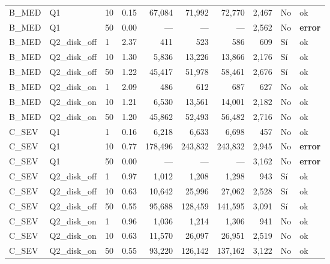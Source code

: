 \documentclass[12pt,a4paper]{article}
\begin{document}
\begin{longtable}{lllrrrrrll}
\rowcolor{warnbg}
B\_MED  & Q1            & 10 & 0.15 & 67{,}084   & 71{,}992  & 72{,}770  & 2{,}467 & No  & \textcolor{green!60!black}{ok} \\
\rowcolor{errbg}
B\_MED  & Q1            & 50 & 0.00 & ---        & ---       & ---       & 2{,}562 & No  & \textcolor{alertred}{\textbf{error}} \\
\rowcolor{warnbg}
B\_MED  & Q2\_disk\_off & 1  & 2.37 & 411        & 523       & 586       & 609     & \textcolor{alertred}{Sí} & \textcolor{green!60!black}{ok} \\
\rowcolor{warnbg}
B\_MED  & Q2\_disk\_off & 10 & 1.30 & 5{,}836    & 13{,}226  & 13{,}866  & 2{,}176 & \textcolor{alertred}{Sí} & \textcolor{green!60!black}{ok} \\
\rowcolor{warnbg}
B\_MED  & Q2\_disk\_off & 50 & 1.22 & 45{,}417   & 51{,}978  & 58{,}461  & 2{,}676 & \textcolor{alertred}{Sí} & \textcolor{green!60!black}{ok} \\
\rowcolor{warnbg}
B\_MED  & Q2\_disk\_on  & 1  & 2.09 & 486        & 612       & 687       & 627     & No  & \textcolor{green!60!black}{ok} \\
\rowcolor{warnbg}
B\_MED  & Q2\_disk\_on  & 10 & 1.21 & 6{,}530    & 13{,}561  & 14{,}001  & 2{,}182 & No  & \textcolor{green!60!black}{ok} \\
\rowcolor{warnbg}
B\_MED  & Q2\_disk\_on  & 50 & 1.20 & 45{,}862   & 52{,}493  & 56{,}482  & 2{,}716 & No  & \textcolor{green!60!black}{ok} \\
\midrule
\rowcolor{errbg}
C\_SEV  & Q1            & 1  & 0.16 & 6{,}218    & 6{,}633   & 6{,}698   & 457     & No  & \textcolor{green!60!black}{ok} \\
\rowcolor{errbg}
C\_SEV  & Q1            & 10 & 0.77 & 178{,}496  & 243{,}832 & 243{,}832 & 2{,}945 & No  & \textcolor{alertred}{\textbf{error}} \\
\rowcolor{errbg}
C\_SEV  & Q1            & 50 & 0.00 & ---        & ---       & ---       & 3{,}162 & No  & \textcolor{alertred}{\textbf{error}} \\
C\_SEV  & Q2\_disk\_off & 1  & 0.97 & 1{,}012    & 1{,}208   & 1{,}298   & 943     & \textcolor{alertred}{Sí} & \textcolor{green!60!black}{ok} \\
C\_SEV  & Q2\_disk\_off & 10 & 0.63 & 10{,}642   & 25{,}996  & 27{,}062  & 2{,}528 & \textcolor{alertred}{Sí} & \textcolor{green!60!black}{ok} \\
C\_SEV  & Q2\_disk\_off & 50 & 0.55 & 95{,}688   & 128{,}459 & 141{,}595 & 3{,}091 & \textcolor{alertred}{Sí} & \textcolor{green!60!black}{ok} \\
C\_SEV  & Q2\_disk\_on  & 1  & 0.96 & 1{,}036    & 1{,}214   & 1{,}306   & 941     & No  & \textcolor{green!60!black}{ok} \\
C\_SEV  & Q2\_disk\_on  & 10 & 0.63 & 11{,}570   & 26{,}097  & 26{,}951  & 2{,}519 & No  & \textcolor{green!60!black}{ok} \\
C\_SEV  & Q2\_disk\_on  & 50 & 0.55 & 93{,}220   & 126{,}142 & 137{,}162 & 3{,}122 & No  & \textcolor{green!60!black}{ok} \\
\end{longtable}
\end{document}
